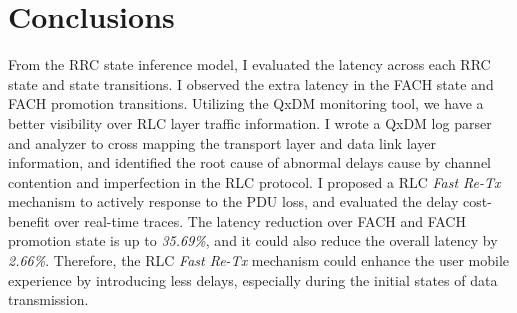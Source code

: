 \section{Conclusions}
\label{sec:conc}

From the RRC state inference model, I evaluated the latency across each RRC state and state transitions. I observed the extra latency in the FACH state and FACH promotion transitions. Utilizing the QxDM monitoring tool, we have a better visibility over RLC layer traffic information. I wrote a QxDM log parser and analyzer to cross mapping the transport layer and data link layer information, and identified the root cause of abnormal delays cause by channel contention and imperfection in the RLC protocol. I proposed a RLC \textit{Fast Re-Tx} mechanism to actively response to the PDU loss, and evaluated the delay cost-benefit over real-time traces. The latency reduction over FACH and FACH promotion state is up to \textit{35.69\%}, and it could also reduce the overall latency by \textit{2.66\%}. Therefore, the RLC \textit{Fast Re-Tx} mechanism could enhance the user mobile experience by introducing less delays, especially during the initial states of data transmission.
